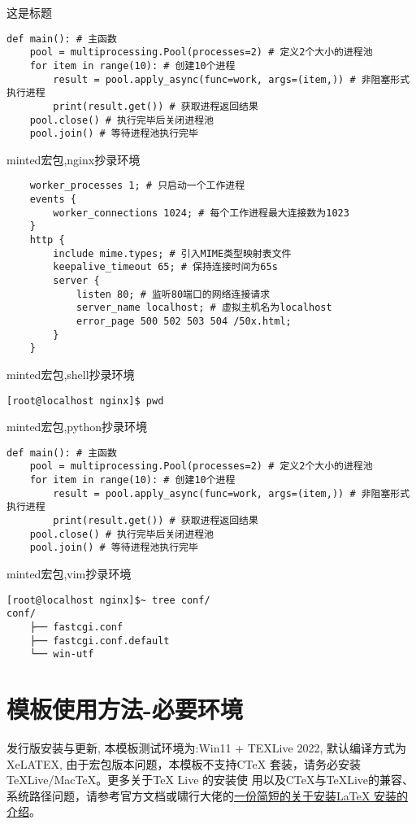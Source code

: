 \begin{macboxd}{这是标题}
\begin{lstlisting}[style=python3]
def main(): # 主函数
    pool = multiprocessing.Pool(processes=2) # 定义2个大小的进程池
    for item in range(10): # 创建10个进程
        result = pool.apply_async(func=work, args=(item,)) # 非阻塞形式执行进程
        print(result.get()) # 获取进程返回结果
    pool.close() # 执行完毕后关闭进程池
    pool.join() # 等待进程池执行完毕
\end{lstlisting}
\end{macboxd}
\iffalse

minted宏包,nginx抄录环境
\begin{verbatim}
    worker_processes 1; # 只启动一个工作进程
    events {
        worker_connections 1024; # 每个工作进程最大连接数为1023
    }
    http {
        include mime.types; # 引入MIME类型映射表文件
        keepalive_timeout 65; # 保持连接时间为65s
        server {
            listen 80; # 监听80端口的网络连接请求
            server_name localhost; # 虚拟主机名为localhost
            error_page 500 502 503 504 /50x.html;
        }
    }
\end{verbatim}

minted宏包,shell抄录环境
\begin{verbatim}
[root@localhost nginx]$ pwd
\end{verbatim}

minted宏包,python抄录环境
\begin{verbatim}
def main(): # 主函数
    pool = multiprocessing.Pool(processes=2) # 定义2个大小的进程池
    for item in range(10): # 创建10个进程
        result = pool.apply_async(func=work, args=(item,)) # 非阻塞形式执行进程
        print(result.get()) # 获取进程返回结果
    pool.close() # 执行完毕后关闭进程池
    pool.join() # 等待进程池执行完毕
\end{verbatim}

minted宏包,vim抄录环境
\begin{verbatim}
[root@localhost nginx]$~ tree conf/
conf/
    ├── fastcgi.conf
    ├── fastcgi.conf.default
    └── win-utf
\end{verbatim}

\section{模板使用方法-必要环境}

发行版安装与更新, 本模板测试环境为:Win11 + TEXLive 2022, 默认编译方式为XeLATEX,
由于宏包版本问题，本模板不支持C\TeX{} 套装，请务必安装\TeX Live/Mac\TeX{}。更多关于\TeX{} Live 的安装使
用以及C\TeX{}与\TeX Live的兼容、系统路径问题，请参考官方文档或啸行大佬的\href{https://github.com/OsbertWang/install-latex-guide-zh-cn/releases/}{一份简短的关于安装\LaTeX{} 安装的介绍}。

